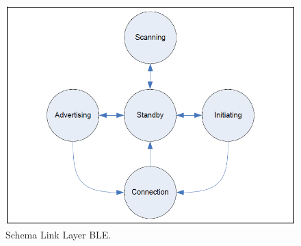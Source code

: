 \begin{figure}[t]
	\centering
	\includegraphics[width=0.9\linewidth, keepaspectratio]{Images/bt/bt_fsa}
	\caption[Link Layer.]{Schema Link Layer BLE\cite{BT-CoreSpec4.0}.}
	\label{fig:bt_fsa}
\end{figure}
